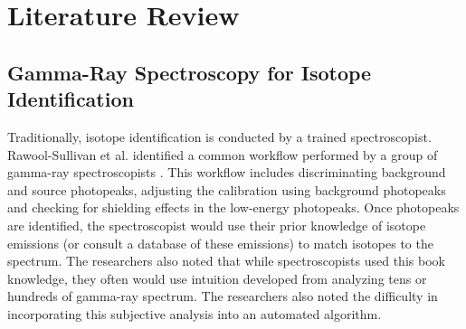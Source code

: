 \documentclass[tocnosub,noragright,centerchapter,12pt,fullpage]{uiucecethesis09}
\begin{document}















\chapter{Literature Review}


\section{Gamma-Ray Spectroscopy for Isotope Identification}

Traditionally, isotope identification is conducted by a trained spectroscopist. Rawool-Sullivan et al. identified a common workflow performed by a group of gamma-ray spectroscopists \cite{Sullivan2010}. This workflow includes discriminating background and source photopeaks, adjusting the calibration using background photopeaks and checking for shielding effects in the low-energy photopeaks. Once photopeaks are identified, the spectroscopist would use their prior knowledge of isotope emissions (or consult a database of these emissions) to match isotopes to the spectrum. The researchers also noted that while  spectroscopists used this book knowledge, they often would use intuition developed from analyzing tens or hundreds of gamma-ray spectrum. The researchers also noted the difficulty in incorporating this subjective analysis into an automated algorithm.
\end{document}
